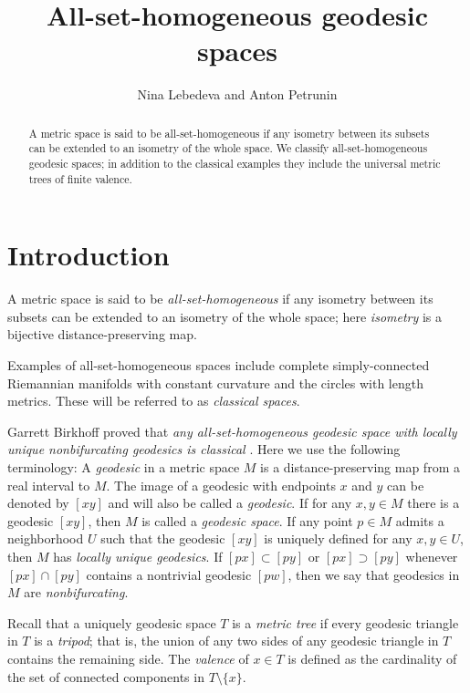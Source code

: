 \documentclass[leqno,a4paper,10pt]{article}
\def\thetitle{All-set-homogeneous geodesic spaces}
\def\theauthors{Nina Lebedeva and Anton Petrunin}
\begin{document}
\title{\thetitle}
\author{\theauthors}
\date{}
\maketitle

\begin{abstract}
A metric space is said to be all-set-homogeneous if any isometry between its subsets can be extended to an isometry of the whole space.
We classify all-set-homogeneous geodesic spaces;
in addition to the classical examples they include the universal metric trees of finite valence.
\end{abstract}

\section{Introduction}

A metric space is said to be \emph{all-set-homogeneous}
if any isometry between its subsets can be extended to an isometry of the whole space; here \emph{isometry} is a bijective distance-preserving map.

Examples of all-set-homogeneous spaces include complete simply-connected Riemannian manifolds with constant curvature and the circles with length metrics.
These will be referred to as \emph{classical spaces}.

Garrett Birkhoff proved that \emph{any all-set-homogeneous geodesic space with locally unique nonbifurcating geodesics is classical} \cite{birkhoff}.
Here we use the following terminology:
A \emph{geodesic} in a metric space $M$ is a distance-preserving map from a real interval to $M$.
The image of a geodesic with endpoints $x$ and $y$ can be denoted by $[xy]$ and will also be called a \emph{geodesic}.
If for any $x,y\in M$ there is a geodesic $[xy]$, then $M$ is called a \emph{geodesic space}.
If any point $p\in M$ admits a neighborhood $U$ such that the geodesic $[xy]$ is uniquely defined for any $x,y\in U$,
then $M$ has \emph{locally unique geodesics}.
If $[px]\subset [py]$ or $[px]\supset [py]$ whenever $[px]\cap [py]$ contains a nontrivial geodesic $[pw]$,
then we say that geodesics in $M$ are \emph{nonbifurcating}.

Recall that a uniquely geodesic space $T$ is a \emph{metric tree} if every geodesic triangle in $T$ is a \emph{tripod};
that is, the union of any two sides of any geodesic triangle in $T$ contains the remaining side.
The \emph{valence} of $x\in T$ is defined as the cardinality of the set of connected components in $T\setminus \{x\}$.
\end{document}
